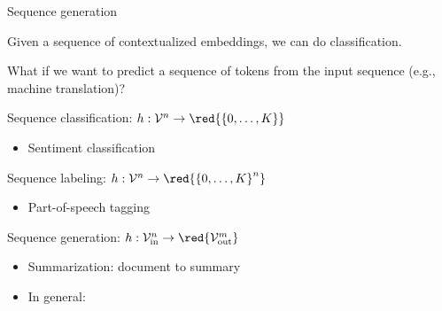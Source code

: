 \documentclass[usenames,dvipsnames,notes,11pt,aspectratio=169,hyperref={colorlinks=true, linkcolor=blue}]{beamer}
\begin{document}
\begin{frame}
    {Sequence generation}
    \begin{wideitemize}[<+->]
        \item Given a sequence of contextualized embeddings, we can do classification.
        \item What if we want to predict a sequence of tokens from the input sequence (e.g., machine translation)?
        \item Sequence classification: $h: \sV^n \rightarrow \red{\pc{0,\ldots,K}}$
            \begin{itemize}[<.->]
                \item Sentiment classification
            \end{itemize}
        \item Sequence labeling: $h: \sV^n \rightarrow \red{\pc{0,\ldots,K}^n}$
            \begin{itemize}[<.->]
                \item Part-of-speech tagging 
            \end{itemize}

        \item Sequence generation: $h: \sV_{\text{in}}^n \rightarrow \red{\sV_{\text{out}}^m}$
            \begin{itemize}[<.->]
                \item Summarization: document to summary
                \item In general: 
            \end{itemize}
    \end{wideitemize}
   
\end{frame}
\end{document}
